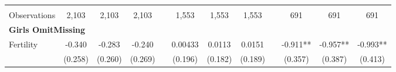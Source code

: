 \begin{landscape}
\begin{table}[htpb!]
\begin{center}
\begin{tabular}{lcccp{2mm}cccp{2mm}ccc}
\begin{footnotesize}\end{footnotesize}&\begin{footnotesize}\end{footnotesize}&\begin{footnotesize}\end{footnotesize}&\begin{footnotesize}\end{footnotesize}&\begin{footnotesize}\end{footnotesize}&\begin{footnotesize}\end{footnotesize}&\begin{footnotesize}\end{footnotesize}&\begin{footnotesize}\end{footnotesize}&\begin{footnotesize}\end{footnotesize}&\begin{footnotesize}\end{footnotesize}&\begin{footnotesize}\end{footnotesize}&\begin{footnotesize}\end{footnotesize}\\Observations&2,103&2,103&2,103&&1,553&1,553&1,553&&691&691&691\\
\multicolumn{12}{l}{\textbf{Girls OmitMissing}}\\ 
Fertility&-0.340&-0.283&-0.240&&0.00433&0.0113&0.0151&&-0.911**&-0.957**&-0.993**\\
&(0.258)&(0.260)&(0.269)&&(0.196)&(0.182)&(0.189)&&(0.357)&(0.387)&(0.413)\\

\end{tabular}
\end{center}
\end{table}
\end{landscape}
